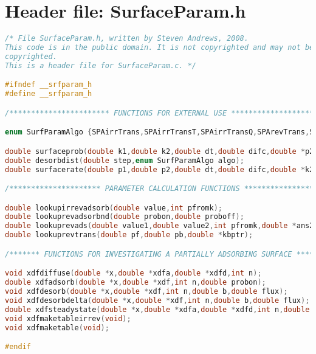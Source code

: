 \documentclass[11pt]{article}
\begin{document}
\maketitle

\section{Header file: SurfaceParam.h}

\begin{lstlisting}[language=C]
/* File SurfaceParam.h, written by Steven Andrews, 2008.
This code is in the public domain. It is not copyrighted and may not be
copyrighted.
This is a header file for SurfaceParam.c. */

#ifndef __srfparam_h
#define __srfparam_h

/*********************** FUNCTIONS FOR EXTERNAL USE ***********************/

enum SurfParamAlgo {SPAirrTrans,SPAirrTransT,SPAirrTransQ,SPArevTrans,SPAirrAds,SPAirrAdsT,SPAirrAdsQ,SPAirrAdsEC,SPArevAds,SPArevAdsND,SPAirrDes,SPArevDes,SPAirrFlip,SPArevFlip,SPAirrDesC,SPArevAdsC};

double surfaceprob(double k1,double k2,double dt,double difc,double *p2ptr,enum SurfParamAlgo algo);
double desorbdist(double step,enum SurfParamAlgo algo);
double surfacerate(double p1,double p2,double dt,double difc,double *k2ptr,enum SurfParamAlgo algo);

/********************* PARAMETER CALCULATION FUNCTIONS ********************/

double lookupirrevadsorb(double value,int pfromk);
double lookuprevadsorbnd(double probon,double proboff);
double lookuprevads(double value1,double value2,int pfromk,double *ans2ptr);
double lookuprevtrans(double pf,double pb,double *kbptr);

/******* FUNCTIONS FOR INVESTIGATING A PARTIALLY ADSORBING SURFACE *******/

void xdfdiffuse(double *x,double *xdfa,double *xdfd,int n);
double xdfadsorb(double *x,double *xdf,int n,double probon);
void xdfdesorb(double *x,double *xdf,int n,double b,double flux);
void xdfdesorbdelta(double *x,double *xdf,int n,double b,double flux);
double xdfsteadystate(double *x,double *xdfa,double *xdfd,int n,double cs,double b,double probon,double proboff,double eps);
void xdfmaketableirrev(void);
void xdfmaketable(void);

#endif
\end{lstlisting}
\end{document}
